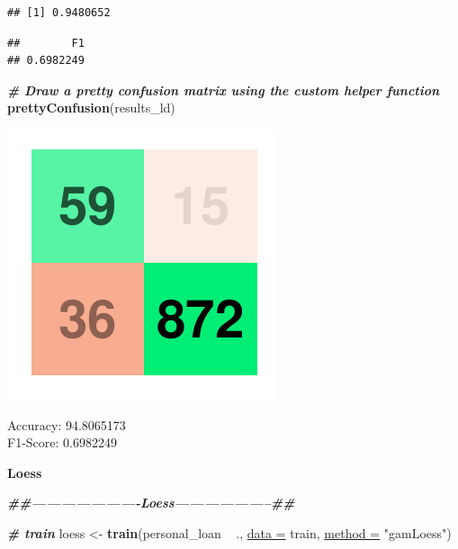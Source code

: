 \documentclass[
]{article}
\newenvironment{Shaded}{\begin{snugshade}}{\end{snugshade}}
\newcommand{\CommentTok}[1]{\textcolor[rgb]{0.00,0.40,1.00}{\textbf{\textit{#1}}}}
\newcommand{\DataTypeTok}[1]{\textcolor[rgb]{0.74,0.68,0.62}{\underline{#1}}}
\newcommand{\KeywordTok}[1]{\textcolor[rgb]{0.26,0.66,0.93}{\textbf{#1}}}
\newcommand{\NormalTok}[1]{\textcolor[rgb]{0.74,0.68,0.62}{#1}}
\newcommand{\OperatorTok}[1]{\textcolor[rgb]{0.74,0.68,0.62}{#1}}
\newcommand{\StringTok}[1]{\textcolor[rgb]{0.02,0.61,0.04}{#1}}
\begin{document}
\begin{verbatim}
## [1] 0.9480652
\end{verbatim}

\begin{Shaded}
\end{Shaded}

\begin{verbatim}
##        F1 
## 0.6982249
\end{verbatim}

\begin{Shaded}
\begin{Highlighting}[]
\CommentTok{# Draw a pretty confusion matrix using the custom helper function}
\KeywordTok{prettyConfusion}\NormalTok{(results_ld)}
\end{Highlighting}
\end{Shaded}

\includegraphics{Bank_Loan_Classification_files/figure-latex/unnamed-chunk-30-1.pdf}

Accuracy: 94.8065173\\
F1-Score: 0.6982249

\textbf{Loess}

\begin{Shaded}
\begin{Highlighting}[]
\CommentTok{##----------------------Loess--------------------##}

\CommentTok{# train}
\NormalTok{loess <-}\StringTok{ }\KeywordTok{train}\NormalTok{(personal_loan }\OperatorTok{~}\StringTok{ }\NormalTok{., }\DataTypeTok{data =}\NormalTok{ train, }\DataTypeTok{method =} \StringTok{"gamLoess"}\NormalTok{)}
\end{Highlighting}
\end{Shaded}
\end{document}
